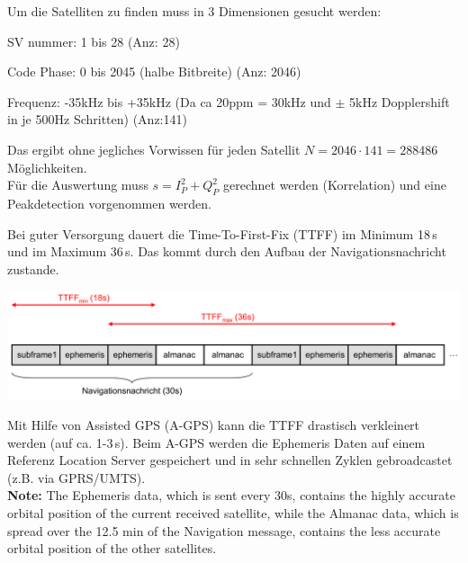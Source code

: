 	Um die Satelliten zu finden muss in 3 Dimensionen gesucht werden:
	\begin{liste}
    	\item SV nummer: 	1 bis 28 (Anz: 28)
    	\item Code Phase: 	0 bis 2045 (halbe Bitbreite) (Anz: 2046)
    	\item Frequenz:		-35kHz bis +35kHz (Da ca 20ppm = 30kHz und $\pm$ 5kHz
    	Dopplershift in je 500Hz Schritten) (Anz:141)
    \end{liste}
	Das ergibt ohne jegliches Vorwissen für jeden Satellit $N=2046\cdot
	141=288486$ Möglichkeiten.\\
	Für die Auswertung muss $s=I_P^2+Q_P^2$ gerechnet werden (Korrelation) und eine
	Peakdetection vorgenommen werden.
	
	Bei guter Versorgung dauert die Time-To-First-Fix (TTFF) im Minimum 18\,s und im Maximum 36\,s.
	Das kommt durch den Aufbau der Navigationsnachricht zustande. \\
	\begin{minipage}{14cm}
	    \includegraphics[width=14cm]{./bilder/GPS-ttff.png}
    \end{minipage}
	
	Mit Hilfe von Assisted GPS (A-GPS) kann die TTFF drastisch verkleinert werden (auf ca. 1-3\,s). Beim A-GPS werden die 
	Ephemeris Daten auf einem Referenz Location Server gespeichert und in sehr schnellen Zyklen gebroadcastet (z.B. via GPRS/UMTS). \\
	
	\textbf{Note:} The Ephemeris data, which is sent every 30s, contains the highly accurate orbital position of the 
	current received satellite, while the Almanac data, which is spread over the 12.5 min of the Navigation message, 
	contains the less accurate orbital position of the other satellites.
	

